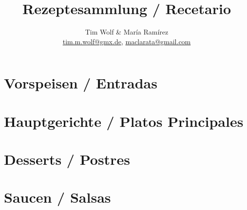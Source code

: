 \documentclass[%
a4paper,
11pt
]{article}
\begin{document}
\title{Rezeptesammlung / Recetario}
\author{Tim Wolf \& Mar\'{i}a Ram\'{i}rez\\ \href{mailto:tim.m.wolf@gmx.de}{tim.m.wolf@gmx.de}, \href{mailto:maclarata@gmail.com}{maclarata@gmail.com}}
\maketitle
\cleardoublepage
%
%
\tableofcontents

\section{Vorspeisen  / Entradas}
\cleardoublepage


\section{Hauptgerichte / Platos Principales}



















\section{Desserts / Postres}



\section{Saucen / Salsas}






\end{document}
